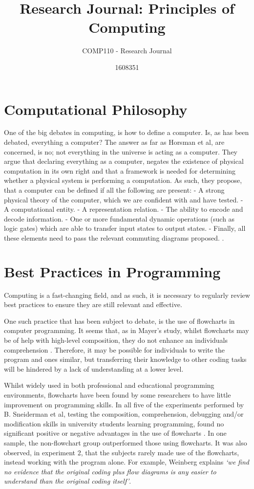 \documentclass{scrartcl}
\title{Research Journal: Principles of Computing}
\subtitle{COMP110 - Research Journal}
\author{1608351}
\begin{document}
\maketitle

\section{Computational Philosophy}

One of the big debates in computing, is how to define a computer. Is, as has been debated, everything a computer? The answer as far as Horsman et al, are concerned, is no; not everything in the universe is acting as a computer. They argue that declaring everything as a computer, negates the existence of physical computation in its own right and that a framework is needed for determining whether a physical system is performing a computation. As such, they propose, that a computer can be defined if all the following are present:
- A strong physical theory of the computer, which we are confident with and have tested.
- A computational entity.
- A representation relation.
- The ability to encode and decode information.
- One or more fundamental dynamic operations (such as logic gates) which are able to transfer input states to output states. 
- Finally, all these elements need to pass the relevant commuting diagrams proposed. \cite{Horsman2014}. 


\section{Best Practices in Programming}

Computing is a fast-changing field, and as such, it is necessary to regularly review best practices to ensure they are still relevant and effective. 

One such practice that has been subject to debate, is the use of flowcharts in computer programming. It seems that, as in Mayer's study, whilst flowcharts may be of help with high-level composition, they do not enhance an individuals comprehension \cite{Mayer}. Therefore, it may be possible for individuals to write the program and ones similar, but transferring their knowledge to other coding tasks will be hindered by a lack of understanding at a lower level. 

Whilst widely used in both professional and educational programming environments, flowcharts have been found by some researchers to have little improvement on programming skills. In all five of the experiments performed by B. Sneiderman et al, testing the composition, comprehension, debugging and/or modification skills in university students learning programming, found no significant positive or negative advantages in the use of flowcharts \cite{Sneiderman}. In one sample, the non-flowchart group outperformed those using flowcharts. It was also observed, in experiment 2, that the subjects rarely made use of the flowcharts, instead working with the program alone. For example, Weinberg explains \textit{`we find no evidence that the original coding plus flow diagrams is any easier to understand than the original coding itself'}\cite{Weinberg}. 
\end{document}
